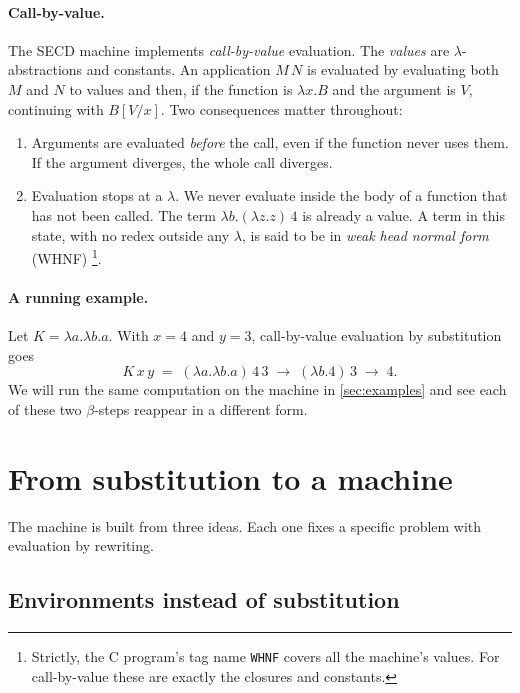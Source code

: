 \documentclass[11pt,a4paper]{article}
\theoremstyle{definition}
\theoremstyle{plain}
\begin{document}
\paragraph{Call-by-value.}
The SECD machine implements \emph{call-by-value} evaluation. The
\emph{values} are $\lambda$-abstractions and constants. An application
$M\,N$ is evaluated by evaluating both $M$ and $N$ to values and then, if the
function is $\lambda x.B$ and the argument is $V$, continuing with $B[V/x]$.
Two consequences matter throughout:
\begin{enumerate}[nosep]
\item Arguments are evaluated \emph{before} the call, even if the function
  never uses them. If the argument diverges, the whole call diverges.
\item Evaluation stops at a $\lambda$. We never evaluate inside the body of a
  function that has not been called. The term $\lambda b.(\lambda z.z)\,4$ is
  already a value. A term in this state, with no redex outside any $\lambda$,
  is said to be in \emph{weak head normal form} (WHNF)%
  \footnote{Strictly, the C program's tag name \texttt{WHNF} covers all the
  machine's values. For call-by-value these are exactly the closures and
  constants.}.
\end{enumerate}

\paragraph{A running example.}
Let $K = \lambda a.\lambda b.a$. With $x=4$ and $y=3$, call-by-value
evaluation by substitution goes
\begin{equation}\label{eq:ksub}
  K\,x\,y \;=\; (\lambda a.\lambda b.a)\,4\,3
  \;\to\; (\lambda b.4)\,3
  \;\to\; 4 .
\end{equation}
We will run the same computation on the machine in \cref{sec:examples} and
see each of these two $\beta$-steps reappear in a different form.

\section{From substitution to a machine}\label{sec:ideas}

The machine is built from three ideas. Each one fixes a specific problem with
evaluation by rewriting.

\subsection{Environments instead of substitution}
\end{document}
